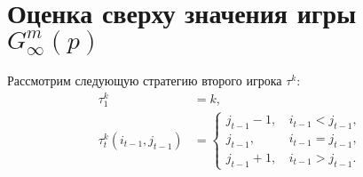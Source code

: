 \section{Оценка сверху значения игры $ G^m_\infty(p) $}
\label{sec:upper_bound}
Рассмотрим следующую стратегию второго игрока $ \tau^k $:
\begin{equation}
\label{eq:strategy:sp}
\begin{aligned}
\tau_1^k &= k, \\
\tau_t^k(i_{t-1}, j_{t-1}) &= \begin{cases}
    j_{t-1} - 1, &\, i_{t-1} < j_{t-1}, \\
    j_{t-1}, &\, i_{t-1} = j_{t-1}, \\
    j_{t-1} + 1, &\, i_{t-1} > j_{t-1}.
\end{cases}
\end{aligned}
\end{equation}


